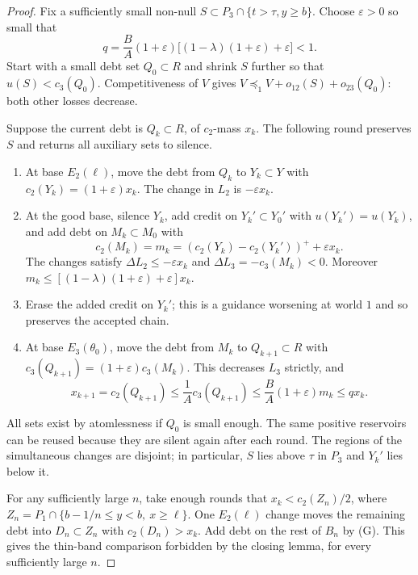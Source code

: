 \documentclass[11pt]{article}
\theoremstyle{remark}\newtheorem{remark}[theorem]{Remark}
\begin{document}
\begin{proof}
Fix a sufficiently small non-null $S\subset P_3\cap\{t>\tau,y\ge b\}$.
Choose $\varepsilon>0$ so small that
\[
 q=\frac BA(1+\varepsilon)
       \big[(1-\lambda)(1+\varepsilon)+\varepsilon\big]<1.
\]
Start with a small debt set $Q_0\subset R$ and shrink $S$ further so that
$u(S)<c_3(Q_0)$. Competitiveness of $V$ gives
$V\preceq_1V+o_{12}(S)+o_{23}(Q_0)$: both other losses decrease.

Suppose the current debt is $Q_k\subset R$, of $c_2$-mass $x_k$.
The following round preserves $S$ and returns all auxiliary sets to silence.
\begin{enumerate}[label=\arabic*.,leftmargin=*,itemsep=3pt]
\item At base $E_2(\ell)$, move the debt from $Q_k$ to $Y_k\subset Y$ with
$c_2(Y_k)=(1+\varepsilon)x_k$. The change in $L_2$ is $-\varepsilon x_k$.
\item At the good base, silence $Y_k$, add credit on $Y_k'\subset Y_0'$
with $u(Y_k')=u(Y_k)$, and add debt on $M_k\subset M_0$ with
\[
 c_2(M_k)=m_k=(c_2(Y_k)-c_2(Y_k'))^++\varepsilon x_k.
\]
The changes satisfy $\Delta L_2\le-\varepsilon x_k$ and
$\Delta L_3=-c_3(M_k)<0$. Moreover
$m_k\le[(1-\lambda)(1+\varepsilon)+\varepsilon]x_k$.
\item Erase the added credit on $Y_k'$; this is a guidance worsening at
world $1$ and so preserves the accepted chain.
\item At base $E_3(\theta_0)$, move the debt from $M_k$ to
$Q_{k+1}\subset R$ with $c_3(Q_{k+1})=(1+\varepsilon)c_3(M_k)$.
This decreases $L_3$ strictly, and
\[
 x_{k+1}=c_2(Q_{k+1})
 \le\frac1A c_3(Q_{k+1})
 \le\frac BA(1+\varepsilon)m_k\le qx_k.
\]
\end{enumerate}
All sets exist by atomlessness if $Q_0$ is small enough. The same positive
reservoirs can be reused because they are silent again after each round.
The regions of the simultaneous changes are disjoint; in particular,
$S$ lies above $\tau$ in $P_3$ and $Y_k'$ lies below it.

For any sufficiently large $n$, take enough rounds that
$x_k<c_2(Z_n)/2$, where
$Z_n=P_1\cap\{b-1/n\le y<b,\ x\ge\ell\}$.
One $E_2(\ell)$ change moves the remaining debt into $D_n\subset Z_n$
with $c_2(D_n)>x_k$. Add debt on the rest of $B_n$ by (G).
This gives the thin-band comparison forbidden by the closing lemma,
for every sufficiently large $n$.
\end{proof}
\end{document}
